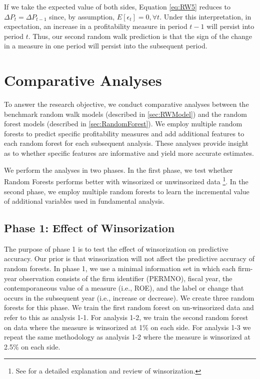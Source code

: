 If we take the expected value of both sides,  Equation \ref{eq:RW5} reduces to  \(\Delta P_t = \Delta P_{t-1}\) since, by assumption, \(E[\epsilon_t] = 0, \forall t \). Under this interpretation, in expectation, an increase in a profitability measure in period \(t-1\) will persist into period \(t\). Thus, our second random walk prediction is that the sign of the change in a measure in one period will persist into the subsequent period.


\section{Comparative Analyses} \label{sec:CAnalyses}

To answer the research objective,  we conduct comparative analyses between the benchmark random walk models (described in \ref{sec:RWModel}) and the random forest models (described in \ref{sec:RandomForest}). We employ multiple random forests to predict specific profitability measures and add additional features to each random forest for each subsequent analysis. These analyses provide insight as to whether specific features are informative and yield more accurate estimates.

We perform the analyses in two phases.  In the first phase,  we test whether Random Forests performs better with winsorized or unwinsorized data \footnote{See \cite{winsor} for a detailed explanation and review of winsorization.}.  In the second phase, we employ multiple random forests to learn the incremental value of additional variables used in fundamental analysis. 


\subsection{Phase 1: Effect of Winsorization}

The purpose of phase 1 is to test the effect of winsorization on predictive accuracy.  Our prior is that winsorization will not affect the predictive accuracy of random forests.  In phase 1, we use a minimal information set in which each firm-year observation consists of the firm identifier (PERMNO), fiscal year, the contemporaneous value of a measure (i.e., ROE), and the label or change that occurs in the subsequent year (i.e., increase or decrease). We create three random forests for this phase.  We train the first random forest on un-winsorized data and refer to this as analysis 1-1.  For analysis 1-2, we train the second random forest on data where the measure is winsorized at 1\% on each side. For analysis 1-3 we repeat the same methodology as analysis 1-2 where the measure is winsorized at 2.5\% on each side.

